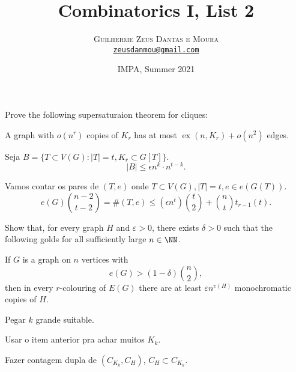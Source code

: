 \documentclass[10pt, a4paper]{article}
\title{\textbf{\textsf{Combinatorics I, List 2}}}
\author{\textsc{Guilherme Zeus Dantas e Moura}\\[2pt]\href{mailto:zeusdanmou@gmail.com}{\texttt{zeusdanmou@gmail.com}}}
\date{IMPA, Summer 2021}
\DeclareMathOperator\ex{ex}
\begin{document}
\maketitle

\begin{prob}
	Prove the following supersaturaion theorem for cliques:

	A graph with $o(n^r)$ copies of $K_r$ has at most $\ex(n, K_r) + o(n^2)$ edges.
\end{prob}

\begin{sk}
	Seja $B = \{T \subset V(G) : |T| = t, K_r \subset G[T]\}$.
	\[ |B| \le \epsilon n^k \cdot n^{t-k}.\]

	Vamos contar os pares de $(T, e)$ onde $T \subset V(G), |T| = t, e \in e(G(T))$. \[
		e(G)\binom{n-2}{t-2} = \#(T, e) \le (\epsilon n^t) \binom{t}{2} + \binom{n}{t} t_{r-1}(t).
	\]

\end{sk}

\newpage
\begin{prob}
	Show that, for every graph $H$ and $\varepsilon > 0$, there exists $\delta > 0$ such that the following golds for all sufficiently large $n \in \NN$.

	If $G$ is a graph on $n$ vertices with \[ e(G) > (1- \delta) \binom{n}{2}, \] then in every $r$-colouring of $E(G)$ there are at least $\varepsilon n^{v(H)}$ monochromatic copies of $H$.	
\end{prob}
\begin{sk}
	Pegar $k$ grande suitable.

	Usar o item anterior pra achar muitos $K_k$.

	Fazer contagem dupla de $(C_{K_k}, C_H)$,  $C_H \subset C_{K_k}$.
\end{sk}
\end{document}
